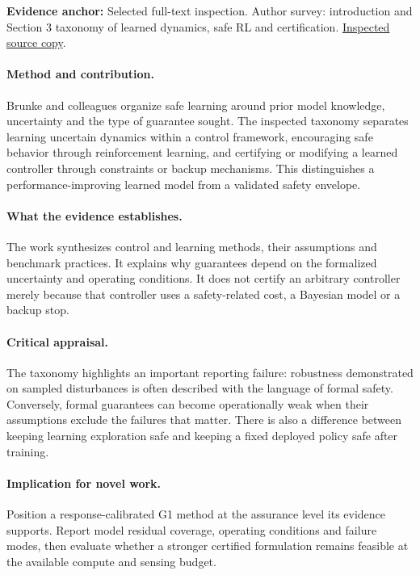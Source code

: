 \textbf{Evidence anchor:} Selected full-text inspection. Author survey: introduction and Section 3 taxonomy of learned dynamics, safe RL and certification. \href{https://arxiv.org/pdf/2108.06266}{Inspected source copy}.

\paragraph{Method and contribution.} Brunke and colleagues organize safe learning around prior model knowledge, uncertainty and the type of guarantee sought. The inspected taxonomy separates learning uncertain dynamics within a control framework, encouraging safe behavior through reinforcement learning, and certifying or modifying a learned controller through constraints or backup mechanisms. This distinguishes a performance-improving learned model from a validated safety envelope.

\paragraph{What the evidence establishes.} The work synthesizes control and learning methods, their assumptions and benchmark practices. It explains why guarantees depend on the formalized uncertainty and operating conditions. It does not certify an arbitrary controller merely because that controller uses a safety-related cost, a Bayesian model or a backup stop.

\paragraph{Critical appraisal.} The taxonomy highlights an important reporting failure: robustness demonstrated on sampled disturbances is often described with the language of formal safety. Conversely, formal guarantees can become operationally weak when their assumptions exclude the failures that matter. There is also a difference between keeping learning exploration safe and keeping a fixed deployed policy safe after training.

\paragraph{Implication for novel work.} Position a response-calibrated G1 method at the assurance level its evidence supports. Report model residual coverage, operating conditions and failure modes, then evaluate whether a stronger certified formulation remains feasible at the available compute and sensing budget.


